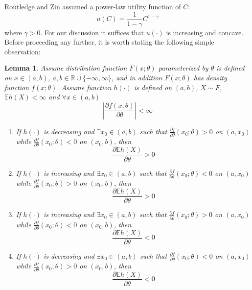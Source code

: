 \documentclass{article}
\newcommand{\pd}[2]{
  \frac{\partial #1}{\partial #2}
}
\newcommand{\E}{
  \mathbb{E}
}
\newcommand{\1}[1]{
  \mathbf{1}_{\{#1\}}
}
\newtheorem{lemma}{Lemma}
\begin{document}
Routledge and Zin \cite{routledge2010generalized} assumed
a power-law utility function of $C$:
\begin{equation}
  \label{eq:power_utility}
  u(C)=\frac{1}{1-\gamma}C^{1-\gamma}%
\end{equation}
where $\gamma > 0$. For our discussion it suffices that $u(\cdot)$ is
increasing and concave. Before proceeding any further, it is worth
stating the following simple observation:
\begin{lemma} \label{lemma:I}
  Assume distribution function $F(x; \theta)$ parameterized by
  $\theta$ is defined on $x \in (a, b)$, $a, b \in \mathbb R \cup
  \{-\infty, \infty\}$, and in addition $F(x; \theta)$ has density
  function $f(x; \theta)$. Assume function $h(\cdot)$ is defined on
  $(a, b)$, $X \sim F$, $\E h(X) < \infty$ and $\forall x \in (a, b)$
  \[
  \left| \pd{f(x, \theta)}{\theta} \right| < \infty
  \]
  \begin{enumerate}
  \item If $h(\cdot)$ is decreasing and $\exists x_0 \in (a, b)$ such that
    $\pd{f}{\theta}(x_0; \theta) > 0$ on $(a, x_0)$ while
    $\pd{f}{\theta}(x_0; \theta) < 0$ on $(x_0, b)$, then
    \[
    \pd{\E h(X)}{\theta} > 0
    \]
  \item If $h(\cdot)$ is increasing and $\exists x_0 \in (a, b)$ such that 
    $\pd{f}{\theta}(x_0; \theta) < 0$ on $(a, x_0)$  while
    $\pd{f}{\theta}(x_0; \theta) > 0$ on $(x_0, b)$, then
    \[
    \pd{\E h(X)}{\theta} > 0
    \]
  \item If $h(\cdot)$ is increasing and $\exists x_0 \in (a, b)$ such that
    $\pd{f}{\theta}(x_0; \theta) > 0$ on $(a, x_0)$ while
    $\pd{f}{\theta}(x_0; \theta) < 0$ on $(x_0, b)$, then
    \[
    \pd{\E h(X)}{\theta} < 0
    \]
  \item If $h(\cdot)$ is decreasing and $\exists x_0 \in (a, b)$ such that 
    $\pd{f}{\theta}(x_0; \theta) < 0$ on $(a, x_0)$  while
    $\pd{f}{\theta}(x_0; \theta) > 0$ on $(x_0, b)$, then
    \[
    \pd{\E h(X)}{\theta} < 0
    \]
  \end{enumerate}
\end{lemma}
\end{document}
